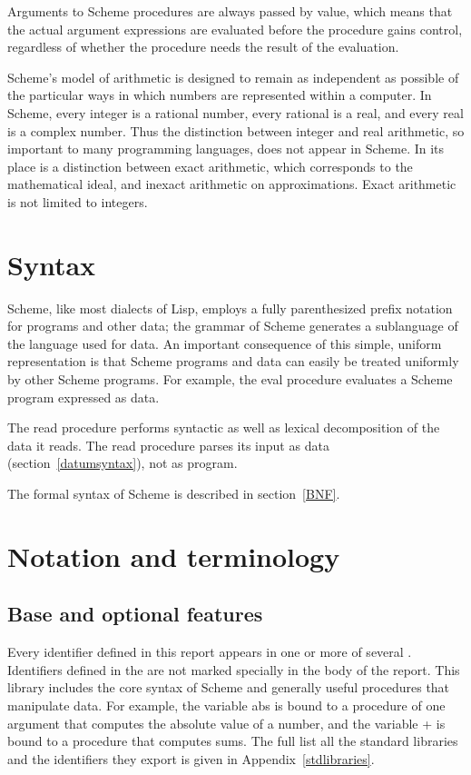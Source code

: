 \vest Arguments to Scheme procedures are always passed by value, which
means that the actual argument expressions are evaluated before the
procedure gains control, regardless of whether the procedure needs the
result of the evaluation.  

\vest Scheme's model of arithmetic is designed to remain as independent as
possible of the particular ways in which numbers are represented within a
computer. In Scheme, every integer is a rational number, every rational is a
real, and every real is a complex number.  Thus the distinction between integer
and real arithmetic, so important to many programming languages, does not
appear in Scheme.  In its place is a distinction between exact arithmetic,
which corresponds to the mathematical ideal, and inexact arithmetic on
approximations.  Exact arithmetic is not limited to integers.

\section{Syntax}

Scheme, like most dialects of Lisp, employs a fully parenthesized prefix
notation for programs and other data; the grammar of Scheme generates a
sublanguage of the language used for data.  An important
consequence of this simple, uniform representation is that
Scheme programs and data can easily be treated uniformly by other Scheme programs.
For example, the {\cf eval} procedure evaluates a Scheme program expressed
as data.

The {\cf read} procedure performs syntactic as well as lexical decomposition of
the data it reads.  The {\cf read} procedure parses its input as data
(section~\ref{datumsyntax}), not as program.

The formal syntax of Scheme is described in section~\ref{BNF}.


\section{Notation and terminology}


\subsection{Base and optional features}
\label{qualifiers}

Every identifier defined in this report appears in one or more of several
.  Identifiers defined in the 
are not marked specially in the body of the report.  
This library includes the core syntax of Scheme
and generally useful procedures that manipulate data.  For example, the
variable {\cf abs} is bound to a
procedure of one argument that computes the absolute value of a
number, and the variable {\cf +} is bound to a procedure that computes
sums.  The full list 
all the standard libraries and the identifiers they export is given in
Appendix~\ref{stdlibraries}.

